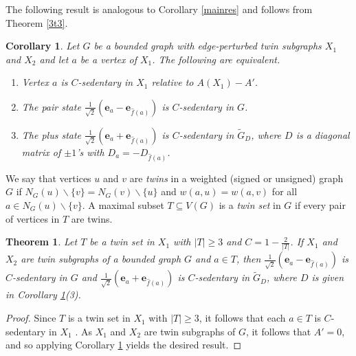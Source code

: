 \documentclass[12pt,a4paper]{article}
\newtheorem{thm}{Theorem}
\newtheorem{cor}{Corollary}
\def \e {{\bf e}}
\def \e {{\mathbf e}}
\begin{document}


The following result is analogous to Corollary \ref{mainres} and follows from Theorem \ref{3t3}.

\begin{cor}\label{3c5}
Let $G$ be a bounded graph with edge-perturbed twin subgraphs $X_1$ and $X_2$ and let $a$ be a vertex of $X_1$. %
The following are equivalent.
\begin{enumerate}
\item Vertex $a$ is $C$-sedentary in $X_1$ relative to $A(X_1)-A'$.
\item The pair state $\frac{1}{\sqrt2}(\e_a-\e_{\hat{f}(a)})$ is $C$-sedentary in $G$.
\item The plus state $\frac{1}{\sqrt2}(\e_a+\e_{\hat{f}(a)})$ is $C$-sedentary in $\tilde{G}_D$, where $D$ is a diagonal matrix of $\pm 1$'s with $D_a=-D_{\hat{f}(a)}$.
\end{enumerate}
\end{cor}

We say that vertices $u$ and $v$ are \textit{twins} in a weighted (signed or unsigned) graph $G$ if $N_G(u)\backslash\{v\}=N_G(v)\backslash\{u\}$ and $w(a,u)=w(a,v)$ for all $a\in N_G(u)\backslash\{v\}$. A maximal subset $T\subseteq V(G)$ is a \textit{twin set} in $G$ if every pair of vertices in $T$ are twins.

\begin{thm}
\label{twins}
Let $T$ be a twin set in $X_1$ with $|T|\geq 3$ and $C=1-\frac{2}{|T|}$. If $X_1$ and $X_2$ are twin subgraphs of a bounded graph $G$ and $a\in T$, then $\frac{1}{\sqrt2}(\e_a-\e_{\hat{f}(a)})$ is $C$-sedentary in $G$ and $\frac{1}{\sqrt2}(\e_a+\e_{\hat{f}(a)})$ is $C$-sedentary in $\tilde{G}_D$, where $D$ is given in Corollary \ref{3c5}(3).
\end{thm}

\begin{proof}
Since $T$ is a twin set in $X_1$ with $|T|\geq 3$, it follows that each $a\in T$ is $C$-sedentary in $X_1$ \cite[Theorem 16]{mon}. As $X_1$ and $X_2$ are twin subgraphs of $G$, it follows that $A'=0$, and so applying Corollary \ref{3c5} yields the desired result.
\end{proof}
\end{document}
